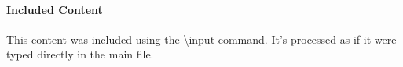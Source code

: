 \paragraph{Included Content}
This content was included using the \textbackslash input command. It's processed as if it were typed directly in the main file.